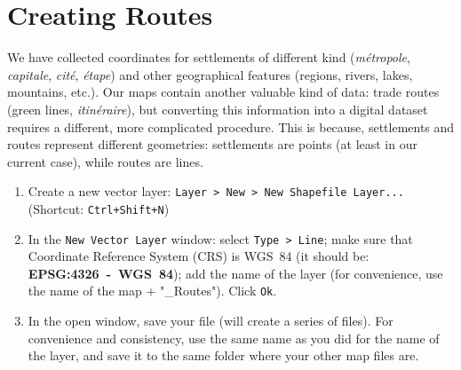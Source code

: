 \documentclass[12pt,oneside]{article}
\begin{document}
\section{Creating Routes}

We have collected coordinates for settlements of different kind (\textit{m\'etropole}, \textit{capitale}, \textit{cit\'e}, \textit{\'etape}) and other geographical features (regions, rivers, lakes, mountains, etc.). Our maps contain another valuable kind of data: trade routes (green lines, \textit{itin\'eraire}), but converting this information into a digital dataset requires a different, more complicated procedure. This is because, settlements and routes represent different geometries: settlements are points (at least in our current case), while routes are lines.

\begin{enumerate}

\item Create a new vector layer: \texttt{Layer > New > New Shapefile Layer...} (Shortcut: \texttt{Ctrl+Shift+N}) 

\item In the \texttt{New Vector Layer} window: select \texttt{Type > Line}; make sure that Coordinate Reference System (CRS) is WGS~84 (it should be: \textbf{EPSG:4326~-~WGS~84}); add the name of the layer (for convenience, use the name of the map + "\_Routes"). Click \texttt{Ok}.

\item In the open window, save your file (\QGIS will create a series of files). For convenience and consistency, use the same name as you did for the name of the layer, and save it to the same folder where your other map files are.




\end{enumerate}
\end{document}

